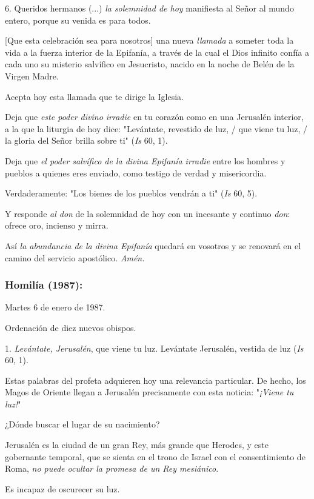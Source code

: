 6. Queridos hermanos (...) \emph{la solemnidad de hoy} manifiesta al
Señor al mundo entero, porque su venida es para todos.

{[}Que esta celebración sea para nosotros{]} una nueva \emph{llamada} a
someter toda la vida a la fuerza interior de la Epifanía, a través de la
cual el Dios infinito confía a cada uno su misterio salvífico en
Jesucristo, nacido en la noche de Belén de la Virgen Madre.

Acepta hoy esta llamada que te dirige la Iglesia.

Deja que \emph{este poder divino irradie} en tu corazón como en una
Jerusalén interior, a la que la liturgia de hoy dice: "Levántate,
revestido de luz, / que viene tu luz, / la gloria del Señor brilla sobre
ti" (\emph{Is} 60, 1).

Deja que \emph{el poder salvífico de la divina Epifanía irradie} entre
los hombres y pueblos a quienes eres enviado, como testigo de verdad y
misericordia.

Verdaderamente: "Los bienes de los pueblos vendrán a ti" (\emph{Is} 60,
5).

Y responde \emph{al don} de la solemnidad de hoy con un incesante y
continuo \emph{don}: ofrece oro, incienso y mirra.

Así \emph{la abundancia de la divina Epifanía} quedará en vosotros y se
renovará en el camino del servicio apostólico. \emph{Amén.}

\subsubsection{Homilía (1987): }

Martes 6 de enero de 1987.

Ordenación de diez nuevos obispos.

1. \emph{Levántate, Jerusalén}, que viene tu luz. Levántate Jerusalén,
vestida de luz (\emph{Is} 60, 1).

Estas palabras del profeta adquieren hoy una relevancia particular. De
hecho, los Magos de Oriente llegan a Jerusalén precisamente con esta
noticia: "\emph{¡Viene tu luz!}"

¿Dónde buscar el lugar de su nacimiento?

Jerusalén es la ciudad de un gran Rey, más grande que Herodes, y este
gobernante temporal, que se sienta en el trono de Israel con el
consentimiento de Roma, \emph{no puede ocultar la promesa de un Rey
	mesiánico}.

Es incapaz de oscurecer su luz.


